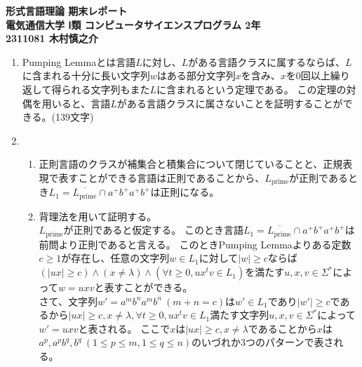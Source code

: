 \documentclass[uplatex,dvipdfmx,a4paper,10pt]{jsarticle}
\begin{document}
    \begin{center}
        {\Large{\bf 形式言語理論 期末レポート}} \\
        {\bf 電気通信大学 Ⅰ類 コンピュータサイエンスプログラム 2年} \\
        {\bf 2311081 木村慎之介} \\
    \end{center}

    \begin{enumerate}
      \item \hspace{1em}Pumping Lemmaとは言語\(L\)に対し、\(L\)がある言語クラスに属するならば、\(L\)に含まれる十分に長い文字列\(w\)はある部分文字列\(x\)を含み、\(x\)を\(0\)回以上繰り返して得られる文字列もまた\(L\)に含まれるという定理である。
            この定理の対偶を用いると、言語\(L\)がある言語クラスに属さないことを証明することができる。(139文字) \\
      \item \begin{enumerate}
              \item \hspace{1em}正則言語のクラスが補集合と積集合について閉じていることと、正規表現で表すことができる言語は正則であることから、\(L_\text{prime}\)が正則であるとき\(L_1 = \overline{L_\text{prime}} \cap a^{+}b^{+}a^{+}b^{+}\)は正則になる。 \\
              \item \hspace{1em}背理法を用いて証明する。 \\
                    \hspace{1em}\(L_\text{prime}\)が正則であると仮定する。
                    このとき言語\(L_1 = \overline{L_\text{prime}} \cap a^{+}b^{+}a^{+}b^{+}\)は前問より正則であると言える。
                    このときPumping Lemmaよりある定数\(c \geq 1\)が存在し、任意の文字列\(w \in L_1\)に対して\(|w| \geq c\)ならば\((|ux| \geq c) \land (x \neq \lambda) \land (\forall t \geq 0,ux^tv \in L_1)\)を満たす\(u, x, v \in \Sigma^{*}\)によって\(w = uxv\)と表すことができる。 \\
                    \hspace{1em}さて、文字列\(w' = a^mb^na^mb^n\ (m + n = c)\)は\(w' \in L_1\)であり\(|w'| \geq c\)であるから\(|ux| \geq c, x \neq \lambda, \forall t \geq 0, ux^tv \in L_1\)満たす文字列\(u, x, v \in \Sigma^{*}\)によって\(w' = uxv\)と表される。
                    ここで\(x\)は\(|ux| \geq c, x \neq \lambda\)であることから\(x\)は\(a^p, a^pb^q, b^q\ (1 \leq p \leq m, 1 \leq q \leq n)\)のいづれか3つのパターンで表される。

\end{enumerate}
\end{enumerate}
\end{document}
